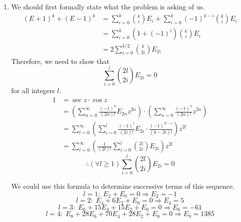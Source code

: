\item

\begin{enumerate}[wide, labelindent = 0pt, label = (\alph*)]
\item
We should first formally state what the problem is asking of us.
\begin{align*}
	{(E + 1)}^k + {(E - 1)}^k
	&= \sum_{i = 0}^k \binom{k}{i} E_i + \sum_{i = 0}^k {(-1)}^{k - i} \binom{k}{i} E_i \\
	&= \sum_{i = 0}^k \left( 1 + {(-1)}^i \right) \binom{k}{i} E_i \\
	&= 2 \sum_{i = 0}^{k / 2} \binom{k}{2i} E_{2i}
\end{align*}
Therefore, we need to show that
\[
	\sum_{i = 0}^{l} \binom{2l}{2i} E_{2i} = 0
\]
for all integers $l$.
\begin{align*}
	1
	&= \sec z \cdot \cos z \\
	&= \left(
		\sum_{n = 0}^\infty \frac{{(-1)}^n}{(2n)!} E_{2n} z^{2n}
	\right) \cdot \left(
		\sum_{n = 0}^\infty \frac{{(-1)}^n}{(2n)!} z^{2n}
	\right) \\
	&= \sum_{l = 0}^\infty \left(
		\sum_{i = 0}^l \frac{{(-1)}^i}{(2i)!} E_{2i} \cdot \frac{{(-1)}^{2l - i}}{(k - 2i)!}
	\right) z^{2l} \\
	&= \sum_{l = 0}^\infty \left(
		\frac{1}{(2l)!} \sum_{i = 0}^l \binom{2l}{2i} E_{2i}
	\right) z^{2l}
\end{align*}
\[
	\therefore (\forall l \geq 1) \sum_{i = 0}^l \binom{2l}{2i} E_{2i} = 0
\]

We could use this formula to determine successive terms of this sequence.
\[
	l = 1:\; E_2 + E_0 = 0 \Rightarrow E_2 = -1
\]
\[
	l = 2:\; E_4 + 6E_2 + E_0 = 0 \Rightarrow E_4 = 5
\]
\[
	l = 3:\; E_6 + 15E_4 + 15E_2 + E_0 = 0 \Rightarrow E_6 = -61
\]
\[
	l = 4:\; E_8 + 28E_6 + 70E_4 + 28E_2 + E_0 = 0 \Rightarrow E_9 = 1385
\]


\end{enumerate}
